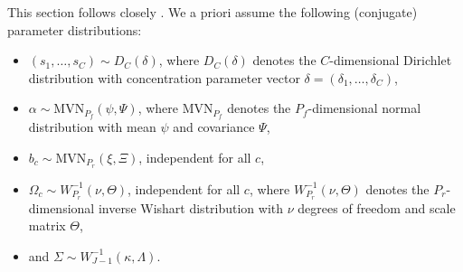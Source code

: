\documentclass[article]{jss}
\begin{document}
This section follows closely \cite{Oelschlaeger:2020}. We a priori assume the following (conjugate) parameter distributions:
\begin{itemize}
  \item $(s_1,\dots,s_C)\sim D_C(\delta)$, where $D_C(\delta)$ denotes the $C$-dimensional Dirichlet distribution with concentration parameter vector $\delta = (\delta_1,\dots,\delta_C)$,
  \item $\alpha\sim \text{MVN}_{P_f}(\psi,\Psi)$, where $\text{MVN}_{P_f}$ denotes the $P_f$-dimensional normal distribution with mean $\psi$ and covariance $\Psi$,
  \item $b_c \sim \text{MVN}_{P_r}(\xi,\Xi)$, independent for all $c$,
  \item $\Omega_c \sim W^{-1}_{P_r}(\nu,\Theta)$, independent for all $c$, where $W^{-1}_{P_r}(\nu,\Theta)$ denotes the $P_r$-dimensional inverse Wishart distribution with $\nu$ degrees of freedom and scale matrix $\Theta$,
  \item and $\Sigma \sim W^{-1}_{J-1}(\kappa,\Lambda)$.
\end{itemize}
\end{document}
